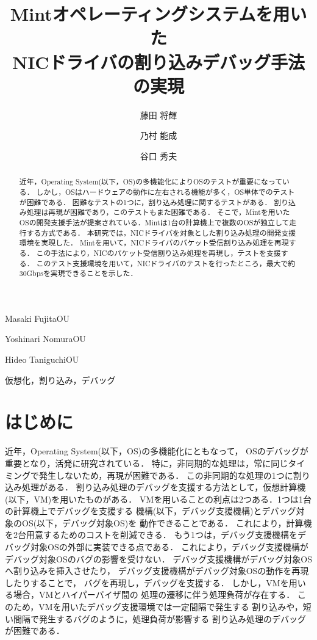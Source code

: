\documentclass[submit,techreq,noauthor,dvipdfmx]{ipsj}
\begin{document}
\title{Mintオペレーティングシステムを用いた\\NICドライバの割り込みデバッグ手法の実現}


\author{藤田 将輝}{Masaki Fujita}{OU}
\author{乃村 能成}{Yoshinari Nomura}{OU}
\author{谷口 秀夫}{Hideo Taniguchi}{OU}

\begin{abstract}

    近年，Operating System(以下，OS)の多機能化によりOSのテストが重要になっている．
    しかし，OSはハードウェアの動作に左右される機能が多く，OS単体でのテストが困難である．
    困難なテストの1つに，割り込み処理に関するテストがある．
    割り込み処理は再現が困難であり，このテストもまた困難である．
    そこで，Mintを用いたOSの開発支援手法が提案されている．Mintは1台の計算機上で複数のOSが独立して走行する方式である．
    本研究では，NICドライバを対象とした割り込み処理の開発支援環境を実現した．
    Mintを用いて，NICドライバのパケット受信割り込み処理を再現する．
    この手法により，NICのパケット受信割り込み処理を再現し，テストを支援する．
    このテスト支援環境を用いて，NICドライバのテストを行ったところ，最大で約30Gbpsを実現できることを示した．


\end{abstract}

\begin{jkeyword}
    仮想化，割り込み，デバッグ
\end{jkeyword}
\maketitle

\section{はじめに}

近年，Operating System(以下，OS)の多機能化にともなって，
OSのデバッグが重要となり，活発に研究されている．
特に，非同期的な処理は，常に同じタイミングで発生しないため，再現が困難である．
この非同期的な処理の1つに割り込み処理がある．
割り込み処理のデバッグを支援する方法として，仮想計算機(以下，VM)を用いたものがある．
VMを用いることの利点は2つある．1つは1台の計算機上でデバッグを支援する
機構(以下，デバッグ支援機構)とデバッグ対象のOS(以下，デバッグ対象OS)を
動作できることである．
これにより，計算機を2台用意するためのコストを削減できる．
もう1つは，デバッグ支援機構をデバッグ対象OSの外部に実装できる点である．
これにより，デバッグ支援機構がデバッグ対象OSのバグの影響を受けない．
デバッグ支援機構がデバッグ対象OSへ割り込みを挿入させたり，
デバッグ支援機構がデバッグ対象OSの動作を再現したりすることで，
バグを再現し，デバッグを支援する．
しかし，VMを用いる場合，VMとハイパーバイザ間の
処理の遷移に伴う処理負荷が存在する．
このため，VMを用いたデバッグ支援環境では一定間隔で発生する
割り込みや，短い間隔で発生するバグのように，処理負荷が影響する
割り込み処理のデバッグが困難である．
\end{document}
